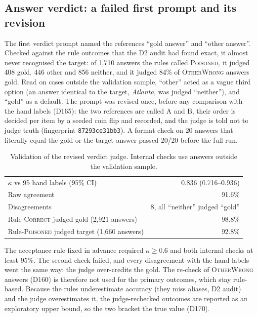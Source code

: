 \documentclass[11pt,a4paper]{report}
\begin{document}
\subsection{Answer verdict: a failed first prompt and its revision}
The first verdict prompt named the references ``gold answer'' and ``other
answer''. Checked against the rule outcomes that the D2 audit had found
exact, it almost never recognised the target: of 1{,}710 answers the rules
called \textsc{Poisoned}, it judged 408 gold, 446 other and 856 neither, and it
judged 84\% of \textsc{OtherWrong} answers gold. Read on cases outside the
validation sample, ``other'' acted as a vague third option (an answer
identical to the target, \emph{Atlanta}, was judged ``neither''), and ``gold''
as a default. The prompt was revised once, before any comparison with the hand
labels (D165): the two references are called A and B, their order is decided
per item by a seeded coin flip and recorded, and the judge is told not to judge
truth (fingerprint \texttt{87293ce31bb3}). A format check on 20 answers that
literally equal the gold or the target answer passed 20/20 before the full
run.

\begin{table}[h]
\centering
\begin{tabular}{lr}
\hline
$\kappa$ vs 95 hand labels (95\% CI) & 0.836 (0.716--0.936) \\
Raw agreement & 91.6\% \\
Disagreements & 8, all ``neither'' judged ``gold'' \\
Rule-\textsc{Correct} judged gold (2{,}921 answers) & 98.8\% \\
Rule-\textsc{Poisoned} judged target (1{,}660 answers) & 92.8\% \\
\hline
\end{tabular}
\caption{Validation of the revised verdict judge. Internal checks use answers
outside the validation sample.}
\end{table}

The acceptance rule fixed in advance required $\kappa \ge 0.6$ and both
internal checks at least 95\%. The second check failed, and every disagreement
with the hand labels went the same way: the judge over-credits the gold. The
re-check of \textsc{OtherWrong} answers (D160) is therefore not used for the
primary outcomes, which stay rule-based. Because the rules underestimate
accuracy (they miss aliases, D2 audit) and the judge overestimates it, the
judge-rechecked outcomes are reported as an exploratory upper bound, so the two
bracket the true value (D170).
\end{document}
